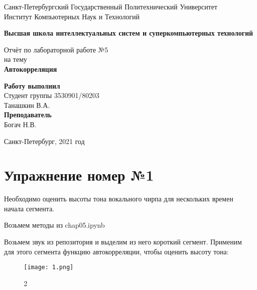 \documentclass[10pt,a4paper,oneside]{article}
\begin{document}
\begin{titlepage}
\newpage
	\begin{center}
		\Large Санкт-Петербургский Государственный Политехнический Университет\\
		Институт Компьютерных Наук и Технологий\\
	\end{center}
	\begin{center}
		\large\textbf {Высшая школа интеллектуальных систем и суперкомпьютерных технологий}
	\end{center}
	
	\vspace{5em}
	\begin{center}
		\large{Отчёт по лабораторной работе №5 \\ на тему \\
		\textbf{Автокорреляция} }
	\end{center}
	
	\vspace{25em}
	\begin{flushright}
		\textbf{Работу выполнил\\}Студент группы 3530901/80203 \\ Танашкин В.А.\\
		\textbf{Преподаватель\\}Богач Н.В. 
	\end{flushright}
	
	\vspace{\fill}%
	\begin{center}
	Санкт-Петербург, 2021 год	
	\end{center}
\end{titlepage} %

\section{Упражнение номер №1}

Необходимо оценить высоты тона вокального чирпа для нескольких времен начала сегмента.

Возьмем методы из chap05.ipynb

Возьмем звук из репозитория и выделим из него короткий сегмент. Применим для этого сегмента функцию автокорреляции, чтобы оценить высоту тона: 

\begin{figure}[H]
        \centering
        \texttt{[image: 1.png]}
        \caption{2}
        \label{fig:first}
\end{figure}
\end{document}
